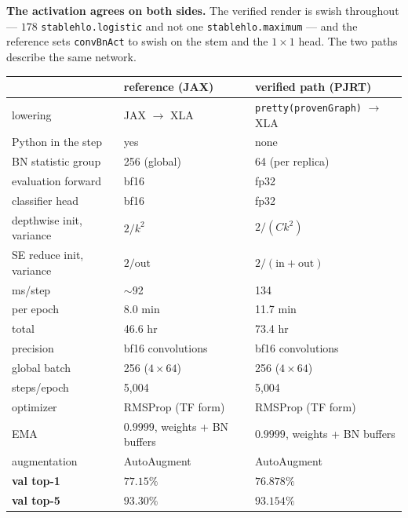 \medskip\noindent\textbf{The activation agrees on both sides.} The verified
render is swish throughout --- $178$ \texttt{stablehlo.logistic} and not one
\texttt{stablehlo.maximum} --- and the reference sets \texttt{convBnAct} to
swish on the stem and the $1\times1$ head. The two paths describe the same
network.


\begin{center}
\begin{tabular}{@{}l l l@{}}
\hline
 & reference (JAX) & verified path (PJRT) \\
\hline
lowering             & JAX $\to$ XLA            & \texttt{pretty(provenGraph)} $\to$ XLA \\
Python in the step   & yes                      & none \\
BN statistic group   & 256 (global)             & 64 (per replica) \\
evaluation forward   & bf16                     & fp32 \\
classifier head      & bf16                     & fp32 \\
depthwise init, variance & $2/k^2$              & $2/(C k^2)$ \\
SE reduce init, variance & $2/\mathrm{out}$     & $2/(\mathrm{in}+\mathrm{out})$ \\
ms/step              & $\sim$92                 & 134 \\
per epoch            & 8.0 min                  & 11.7 min \\
total                & 46.6 hr                  & 73.4 hr \\
\hline
precision            & bf16 convolutions        & bf16 convolutions \\
global batch         & 256 ($4\times64$)        & 256 ($4\times64$) \\
steps/epoch          & 5{,}004                  & 5{,}004 \\
optimizer            & RMSProp (TF form)        & RMSProp (TF form) \\
EMA                  & $0.9999$, weights + BN buffers & $0.9999$, weights + BN buffers \\
augmentation         & AutoAugment              & AutoAugment \\
\hline
\textbf{val top-1}   & $\mathbf{77.15\%}$       & $\mathbf{76.878\%}$ \\
\textbf{val top-5}   & $\mathbf{93.30\%}$       & $\mathbf{93.154\%}$ \\
\hline
\end{tabular}
\end{center}


